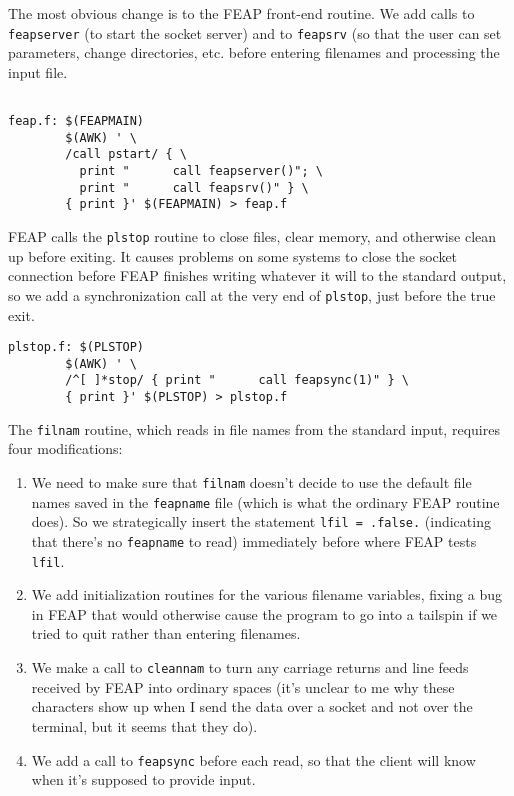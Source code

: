  The most obvious change is to the FEAP front-end routine.  We add calls
 to {\tt feapserver} (to start the socket server) and to {\tt feapsrv}
 (so that the user can set parameters, change directories, etc. before
 entering filenames and processing the input file.

\begin{verbatim}

feap.f: $(FEAPMAIN)
        $(AWK) ' \
        /call pstart/ { \
          print "      call feapserver()"; \
          print "      call feapsrv()" } \
        { print }' $(FEAPMAIN) > feap.f

\end{verbatim}
 FEAP calls the {\tt plstop} routine to close files, clear memory, and
 otherwise clean up before exiting.  It causes problems on some systems
 to close the socket connection before FEAP finishes writing whatever
 it will to the standard output, so we add a synchronization call at
 the very end of {\tt plstop}, just before the true exit.

\begin{verbatim}
plstop.f: $(PLSTOP)
        $(AWK) ' \
        /^[ ]*stop/ { print "      call feapsync(1)" } \
        { print }' $(PLSTOP) > plstop.f

\end{verbatim}
 The {\tt filnam} routine, which reads in file names from the standard
 input, requires four modifications:
 \begin{enumerate}
 \item  We need to make sure that
   {\tt filnam} doesn't decide to use the default file names saved in the
   {\tt feapname} file (which is what the ordinary FEAP routine does).
   So we strategically insert the statement {\tt lfil = .false.} (indicating
   that there's no {\tt feapname} to read) immediately before where FEAP
   tests {\tt lfil}.  
 \item   We add initialization routines for the
   various filename variables, fixing a bug in FEAP that would otherwise
   cause the program to go into a tailspin if we tried to quit rather than
   entering filenames.  
 \item  We make a call to {\tt cleannam} to turn any
   carriage returns and line feeds received by FEAP into ordinary spaces
   (it's unclear to me why these characters show up when I send the data
   over a socket and not over the terminal, but it seems that they do).
 \item   We add a call to {\tt feapsync} before each
   read, so that the client will know when it's supposed to provide input.
 \end{enumerate}

